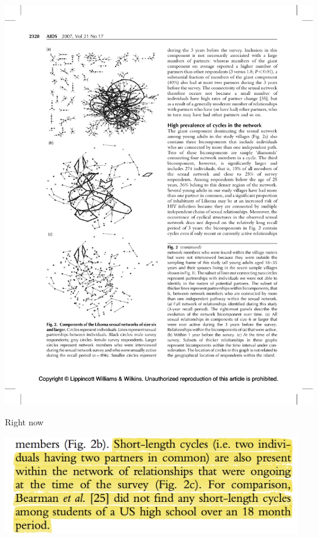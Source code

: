 \documentclass[aspectratio=169]{beamer}
\begin{document}
\begin{frame}

\begin{center}
\includegraphics[height = 0.75\textheight]{figures/helleringer_sexual_2007_fig2c}
\end{center}

\vfill

Right now


\end{frame}
\begin{frame}

\begin{center}
\includegraphics[width = 0.95\textwidth]{figures/helleringer_sexual_2007_cycles}
\end{center}


\end{frame}
\end{document}

